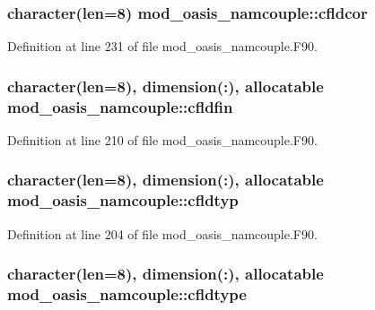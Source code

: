\hypertarget{classmod__oasis__namcouple_a5e1d0d9b3d9f438102623d9643fbc704}{
\subsubsection[{cfldcor}]{\setlength{\rightskip}{0pt plus 5cm}character(len=8) mod\+\_\+oasis\+\_\+namcouple\+::cfldcor\hspace{0.3cm}{\ttfamily [private]}}}\label{classmod__oasis__namcouple_a5e1d0d9b3d9f438102623d9643fbc704}


Definition at line 231 of file mod\+\_\+oasis\+\_\+namcouple.\+F90.

\hypertarget{classmod__oasis__namcouple_aa387fcfde8c2538e22897b243ff5024c}{
\subsubsection[{cfldfin}]{\setlength{\rightskip}{0pt plus 5cm}character(len=8), dimension(\+:), allocatable mod\+\_\+oasis\+\_\+namcouple\+::cfldfin\hspace{0.3cm}{\ttfamily [private]}}}\label{classmod__oasis__namcouple_aa387fcfde8c2538e22897b243ff5024c}


Definition at line 210 of file mod\+\_\+oasis\+\_\+namcouple.\+F90.

\hypertarget{classmod__oasis__namcouple_ab139e7bad0413c79a5ad8e0837d3e0ef}{
\subsubsection[{cfldtyp}]{\setlength{\rightskip}{0pt plus 5cm}character(len=8), dimension(\+:), allocatable mod\+\_\+oasis\+\_\+namcouple\+::cfldtyp\hspace{0.3cm}{\ttfamily [private]}}}\label{classmod__oasis__namcouple_ab139e7bad0413c79a5ad8e0837d3e0ef}


Definition at line 204 of file mod\+\_\+oasis\+\_\+namcouple.\+F90.

\hypertarget{classmod__oasis__namcouple_af6d77b87036aa40faa1ae1ed1b2a0866}{
\subsubsection[{cfldtype}]{\setlength{\rightskip}{0pt plus 5cm}character(len=8), dimension(\+:), allocatable mod\+\_\+oasis\+\_\+namcouple\+::cfldtype\hspace{0.3cm}{\ttfamily [private]}}}\label{classmod__oasis__namcouple_af6d77b87036aa40faa1ae1ed1b2a0866}


